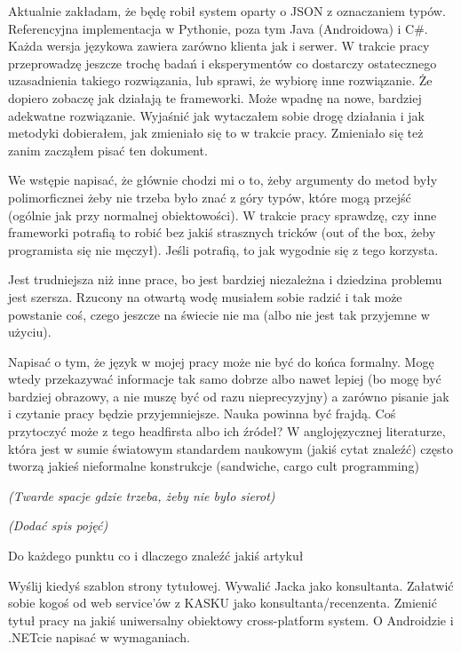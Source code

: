 \documentclass[twoside,a4paper]{book}
\begin{document}
Aktualnie zakładam, że będę robił system oparty o JSON z oznaczaniem typów. Referencyjna implementacja w Pythonie, poza tym Java (Androidowa) i C\#. Każda wersja językowa zawiera zarówno klienta jak i serwer. W trakcie pracy przeprowadzę jeszcze trochę badań i eksperymentów co dostarczy ostatecznego uzasadnienia takiego rozwiązania, lub sprawi, że wybiorę inne rozwiązanie. Że dopiero zobaczę jak działają te frameworki. Może wpadnę na nowe, bardziej adekwatne rozwiązanie. Wyjaśnić jak wytaczałem sobie drogę działania i jak metodyki dobierałem, jak zmieniało się to w trakcie pracy. Zmieniało się też zanim zacząłem pisać ten dokument.

We wstępie napisać, że głównie chodzi mi o to, żeby argumenty do metod były polimorficznei żeby nie trzeba było znać z góry typów, które mogą przejść (ogólnie jak przy normalnej obiektowości). W trakcie pracy sprawdzę, czy inne frameworki potrafią to robić bez jakiś strasznych tricków (out of the box, żeby programista się nie męczył). Jeśli potrafią, to jak wygodnie się z tego korzysta.

Jest trudniejsza niż inne prace, bo jest bardziej niezależna i dziedzina problemu jest szersza. Rzucony na otwartą wodę musiałem sobie radzić i tak może powstanie coś, czego jeszcze na świecie nie ma (albo nie jest tak przyjemne w użyciu).

Napisać o tym, że język w mojej pracy może nie być do końca formalny. Mogę wtedy przekazywać informacje tak samo dobrze albo nawet lepiej (bo mogę być bardziej obrazowy, a nie muszę być od razu nieprecyzyjny) a zarówno pisanie jak i czytanie pracy będzie przyjemniejsze. Nauka powinna być frajdą. Coś przytoczyć może z tego headfirsta albo ich źródeł? W anglojęzycznej literaturze, która jest w sumie światowym standardem naukowym (jakiś cytat znaleźć) często tworzą jakieś nieformalne konstrukcje (sandwiche, cargo cult programming)

\emph{(Twarde spacje gdzie trzeba, żeby nie było sierot)}

\emph{(Dodać spis pojęć)}

\begin{em}
Do każdego punktu co i dlaczego znaleźć jakiś artykuł

Wyślij kiedyś szablon strony tytułowej.
Wywalić Jacka jako konsultanta. Załatwić sobie kogoś od web service’ów z KASKU jako konsultanta/recenzenta. Zmienić tytuł pracy na jakiś uniwersalny obiektowy cross-platform system. O Androidzie i .NETcie napisać w wymaganiach.
\end{em}
\end{document}
